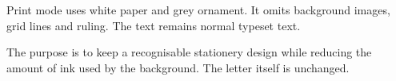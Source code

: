 \documentclass[letterpaper]{seasonalletter}
\begin{document}
\begin{SeasonalLetter}
Print mode uses white paper and grey ornament. It omits background images,
grid lines and ruling. The text remains normal typeset text.

The purpose is to keep a recognisable stationery design while reducing the
amount of ink used by the background. The letter itself is unchanged.
\end{SeasonalLetter}
\end{document}
